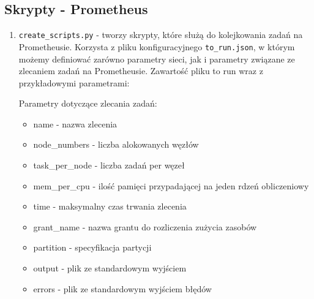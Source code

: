 \subsection{Skrypty - Prometheus}
\begin{enumerate}
	\item {\texttt{create\_scripts.py} } - 
	tworzy skrypty, które służą do kolejkowania zadań na Prometheusie. Korzysta z pliku konfiguracyjnego \texttt{to\_run.json},
	w którym możemy definiować zarówno parametry sieci, jak i parametry związane ze zlecaniem zadań na Prometheusie.
	Zawartość pliku to run wraz z przykładowymi parametrami:
	
	\begin{import}
		[
		  {
		    "beginning": "#!/bin/sh",
		    "name": "#SBATCH -J test",
		    "node_numbers": "#SBATCH -N 1",
		    "tasks_per_node": "#SBATCH --ntasks-per-node=1",
		    "mem_per_cpu": "#SBATCH --mem-per-cpu=5GB",
		    "time": "#SBATCH --time=00:20:00",
		    "grant_name": "#SBATCH -A ap2018",
		    "partition": "#SBATCH -p plgrid",
		    "output": "#SBATCH --output=",
		    "errors": "#SBATCH --error=",
		    "hidden_size": "100",
		    "num_layers": "2",
		    "num_epochs": "5",
		    "batch_size": "40",
		    "timesteps": "50",
		    "learning_rate": "0.004",
		    "authors_size": "100",
		    "vocab_size": "48",
		    "save_path": "../results/",
		    "learning_tensors_path": "../data/dutch/tensors/known/",
		    "testing_tensors_path": "../data/dutch/tensors/known/",
		    "language": "DU"
		  }
		]
	\end{import}
	
	Parametry dotyczące zlecania zadań:
	\begin{itemize}
	  \item name - nazwa zlecenia
	  \item node\_numbers - liczba alokowanych węzłów
	  \item task\_per\_node - liczba zadań per węzeł
	  \item mem\_per\_cpu - ilość pamięci przypadającej na jeden rdzeń obliczeniowy
	  \item time - maksymalny czas trwania zlecenia
	  \item grant\_name - nazwa grantu do rozliczenia zużycia zasobów
	  \item partition - specyfikacja partycji
	  \item output - plik ze standardowym wyjściem
	  \item errors - plik ze standardowym wyjściem błędów
	\end{itemize}
	

\end{enumerate}
